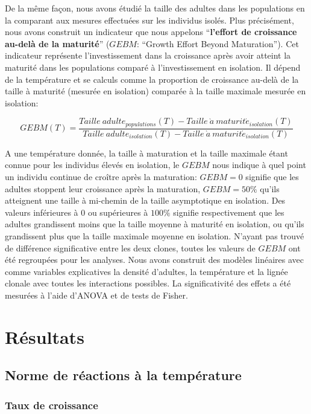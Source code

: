 De la même façon, nous avons étudié la taille des adultes dans les populations
en la comparant aux mesures effectuées sur les individus isolés. Plus
précisément, nous avons construit un indicateur que nous appelons
``\textbf{l'effort de croissance au-delà de la maturité}'' ($GEBM$: ``Growth
Effort Beyond Maturation''). Cet indicateur représente l'investissement dans la
croissance après avoir atteint la maturité dans les populations comparé
à l'investissement en isolation. Il dépend de la température et se calculs comme
la proportion de croissance au-delà de la taille à maturité (mesurée en
isolation) comparée à la taille maximale mesurée en isolation:

\begin{equation}
GEBM(T) = \frac{Taille\ adulte_{populations}(T) -
Taille\ \grave{a} \ maturit\acute{e}_{isolation}(T)}{Taille\ adulte_{isolation}(T) -
Taille\ \grave{a} \ maturit\acute{e}_{isolation}(T)}
\end{equation}

A une température donnée, la taille à maturation et la taille maximale étant
connue pour les individus élevés en isolation, le $GEBM$ nous indique à quel
point un individu continue de croître après la maturation: $GEBM=0$ signifie que
les adultes stoppent leur croissance après la maturation, $GEBM=50\%$ qu'ils
atteignent une taille à mi-chemin de la taille asymptotique en isolation. Des
valeurs inférieures à 0 ou supérieures à $100\%$ signifie respectivement que les
adultes grandissent moins que la taille moyenne à maturité en isolation, ou
qu'ils grandissent plus que la taille maximale moyenne en isolation. N'ayant pas
trouvé de différence significative entre les deux clones, toutes les valeurs de
$GEBM$ ont été regroupées pour les analyses. Nous avons construit des modèles
linéaires avec comme variables explicatives la densité d'adultes, la
température et la lignée clonale avec toutes les interactions possibles. La
significativité des effets a été mesurées à l'aide d'ANOVA et de tests de
Fisher.

\section{Résultats}

\subsection{Norme de réactions à la température}

\subsubsection{Taux de croissance}

